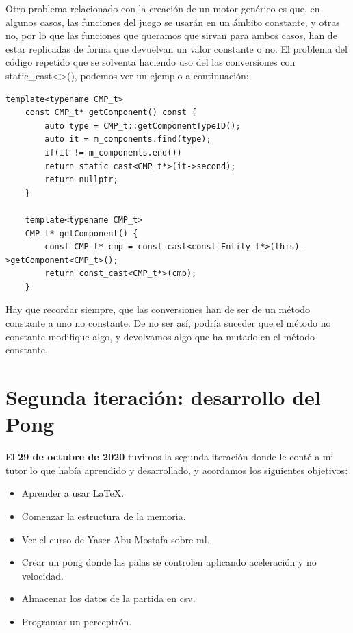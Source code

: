 Otro problema relacionado con la creación de un motor genérico es que, en algunos casos, las funciones del juego se usarán en un ámbito constante, y otras no, por lo que las funciones que queramos que sirvan para ambos casos, han de estar replicadas de forma que devuelvan un valor constante o no. El problema del código repetido que se solventa haciendo uso del las conversiones con static\_cast<>(), podemos ver un ejemplo a continuación:
\begin{lstlisting}[style=C-color, caption={Ejemplo de conversion de un método constante a no constante},label=no-constant-conversion]
	template<typename CMP_t>
	const CMP_t* getComponent() const {
		auto type = CMP_t::getComponentTypeID();
		auto it = m_components.find(type);
		if(it != m_components.end()) 
		return static_cast<CMP_t*>(it->second);
		return nullptr;
	}
	
	template<typename CMP_t>
	CMP_t* getComponent() {
		const CMP_t* cmp = const_cast<const Entity_t*>(this)->getComponent<CMP_t>();
		return const_cast<CMP_t*>(cmp);
	}
\end{lstlisting}
Hay que recordar siempre, que las conversiones han de ser de un método constante a uno no constante. De no ser así, podría suceder que el método no constante modifique algo, y devolvamos algo que ha mutado en el método constante.

\section{Segunda iteración: desarrollo del Pong}
El \textbf{29 de octubre de 2020} tuvimos la segunda iteración donde le conté a mi tutor lo que había aprendido y desarrollado, y acordamos los siguientes objetivos:
\begin{itemize}
  \item Aprender a usar \LaTeX.
  \item Comenzar la estructura de la memoria.
  \item Ver el curso de Yaser Abu-Mostafa sobre \gls{ml}.
  \item Crear un pong donde las palas se controlen aplicando aceleración y no velocidad.
  \item Almacenar los datos de la partida en \gls{csv}.
  \item Programar un perceptrón.
\end{itemize}

